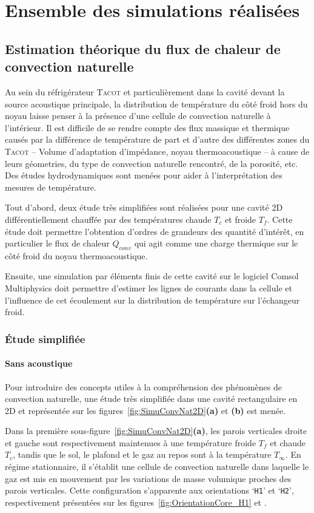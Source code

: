 \section{Ensemble des simulations réalisées}\label{chap:SimusRealisees}
\subsection{Estimation théorique du flux de chaleur de convection naturelle}
Au sein du réfrigérateur \textsc{Tacot} et particulièrement dans la cavité devant la source acoustique principale, la distribution de température du côté froid hors du noyau laisse penser à la présence d'une cellule de convection naturelle à l'intérieur. Il est difficile de se rendre compte des flux massique et thermique causés par la différence de température de part et d'autre des différentes zones du \textsc{Tacot} -- Volume d'adaptation d'impédance, noyau thermoacoustique -- à cause de leurs géometries, du type de convection naturelle rencontré, de la porosité, etc. Des études hydrodynamiques sont menées pour aider à l'interprétation des mesures de température. \medskip

Tout d'abord, deux étude très simplifiées sont réalisées pour une cavité 2D différentiellement chauffée par des températures chaude $T_c$ et froide $T_f$. Cette étude doit permettre l'obtention d'ordres de grandeurs des quantité d'intérêt, en particulier le flux de chaleur $Q_{conv}$ qui agit comme une charge thermique sur le côté froid du noyau thermoacoustique. \smallskip

Ensuite, une simulation par éléments finis de cette cavité sur le logiciel Comsol Multiphysics doit permettre d'estimer les lignes de courants dans la cellule et l'influence de cet écoulement sur la distribution de température sur l'échangeur froid.

\subsubsection{\'Etude simplifiée}
\paragraph{Sans acoustique}
Pour introduire des concepts utiles à la compréhension des phénomènes de convection naturelle, une étude très simplifiée dans une cavité rectangulaire en 2D et représentée sur les figures~\ref{fig:SimuConvNat2D}\textbf{(a)} et \textbf{(b)} est menée. 

Dans la première sous-figure~\ref{fig:SimuConvNat2D}\textbf{(a)}, les parois verticales droite et gauche sont respectivement maintenues à une température froide $T_f$ et chaude $T_c$, tandis que le sol, le plafond et le gaz au repos sont à la température $T_\infty$. En régime stationnaire, il s'établit une cellule de convection naturelle dans laquelle le gaz est mis en mouvement par les  variations de masse volumique proches des parois verticales. Cette configuration s'apparente aux orientations `\texttt{H1}' et `\texttt{H2}', respectivement présentées sur les figures~\ref{fig:OrientationCore_H1} et .

